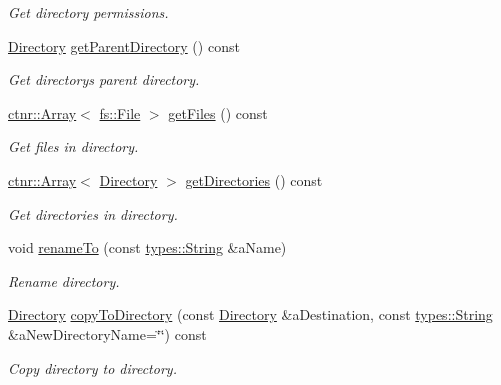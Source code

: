 \begin{DoxyCompactItemize}
\begin{DoxyCompactList}\small\item\em Get directory permissions. \end{DoxyCompactList}\item 
\hyperlink{classlibrary_1_1core_1_1fs_1_1_directory}{Directory} \hyperlink{classlibrary_1_1core_1_1fs_1_1_directory_ad17e782b4937e026064cf90e5b6150e6}{get\+Parent\+Directory} () const
\begin{DoxyCompactList}\small\item\em Get directory\textquotesingle{}s parent directory. \end{DoxyCompactList}\item 
\hyperlink{classlibrary_1_1core_1_1ctnr_1_1_array}{ctnr\+::\+Array}$<$ \hyperlink{classlibrary_1_1core_1_1fs_1_1_file}{fs\+::\+File} $>$ \hyperlink{classlibrary_1_1core_1_1fs_1_1_directory_a9c80c3a09389bb6f024e9a9001dea432}{get\+Files} () const
\begin{DoxyCompactList}\small\item\em Get files in directory. \end{DoxyCompactList}\item 
\hyperlink{classlibrary_1_1core_1_1ctnr_1_1_array}{ctnr\+::\+Array}$<$ \hyperlink{classlibrary_1_1core_1_1fs_1_1_directory}{Directory} $>$ \hyperlink{classlibrary_1_1core_1_1fs_1_1_directory_a31ef325dea750ce2d7ecca49258c2a9a}{get\+Directories} () const
\begin{DoxyCompactList}\small\item\em Get directories in directory. \end{DoxyCompactList}\item 
void \hyperlink{classlibrary_1_1core_1_1fs_1_1_directory_abc9c7c9f9129950cd89c9dbd77978b8f}{rename\+To} (const \hyperlink{classlibrary_1_1core_1_1types_1_1_string}{types\+::\+String} \&a\+Name)
\begin{DoxyCompactList}\small\item\em Rename directory. \end{DoxyCompactList}\item 
\hyperlink{classlibrary_1_1core_1_1fs_1_1_directory}{Directory} \hyperlink{classlibrary_1_1core_1_1fs_1_1_directory_a7d1bd71d46c8fd653cf237dc3ed5aa00}{copy\+To\+Directory} (const \hyperlink{classlibrary_1_1core_1_1fs_1_1_directory}{Directory} \&a\+Destination, const \hyperlink{classlibrary_1_1core_1_1types_1_1_string}{types\+::\+String} \&a\+New\+Directory\+Name=\char`\"{}\char`\"{}) const
\begin{DoxyCompactList}\small\item\em Copy directory to directory. \end{DoxyCompactList}\item 

\end{DoxyCompactItemize}
